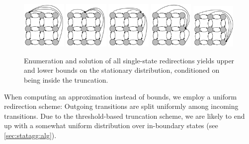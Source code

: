 \begin{figure}[htb]
  \centering
  \includegraphics[width=0.19\textwidth]{gfx/state_space_redirected_1.pdf}
  \includegraphics[width=0.19\textwidth]{gfx/state_space_redirected_2.pdf}
  \includegraphics[width=0.19\textwidth]{gfx/state_space_redirected_3.pdf}
  \includegraphics[width=0.19\textwidth]{gfx/state_space_redirected_4.pdf}
  \includegraphics[width=0.19\textwidth]{gfx/state_space_redirected_5.pdf}
  \caption[Redirections for bounds]{Enumeration and solution of all single-state
    redirections yields upper and lower bounds on the stationary
    distribution, conditioned on being inside the
  truncation.\label{fig:fsp_redirections}}
\end{figure}

When computing an approximation instead of bounds, we employ a
uniform redirection scheme:
Outgoing transitions are split uniformly among incoming transitions.
Due to the threshold-based truncation scheme, we are likely to end up
with a somewhat uniform distribution over in-boundary states (see
\autoref{sec:statagg:alg}).

